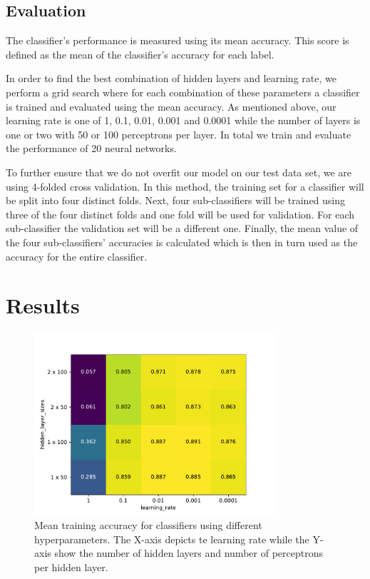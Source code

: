 \documentclass[sigconf]{acmart}
\begin{document}
\subsection{Evaluation}

The classifier's performance is measured using its mean accuracy. This score is defined as the mean of the classifier's accuracy for each label.

In order to find the best combination of hidden layers and learning rate, we perform a grid search where for each combination of these parameters a classifier is trained and evaluated using the mean accuracy. As mentioned above, our learning rate is one of 1, 0.1, 0.01, 0.001 and 0.0001 while the number of layers is one or two with 50 or 100 perceptrons per layer. In total we train and evaluate the performance of 20 neural networks.

To further ensure that we do not overfit our model on our test data set, we are using 4-folded cross validation. In this method, the training set for a classifier will be split into four distinct folds. Next, four sub-classifiers will be trained using three of the four distinct folds and one fold will be used for validation. For each sub-classifier the validation set will be a different one. Finally, the mean value of the four sub-classifiers' accuracies is calculated which is then in turn used as the accuracy for the entire classifier\cite{introduction_ml}.

\section{Results}

\begin{figure}
	\centering
	\includegraphics[width=9cm]{fig2.pdf}
	\caption{Mean training accuracy for classifiers using different hyperparameters. The X-axis depicts te learning rate while the Y-axis show the number of hidden layers and number of perceptrons per hidden layer.}
	\label{fig:heatmap}
\end{figure}
\end{document}
